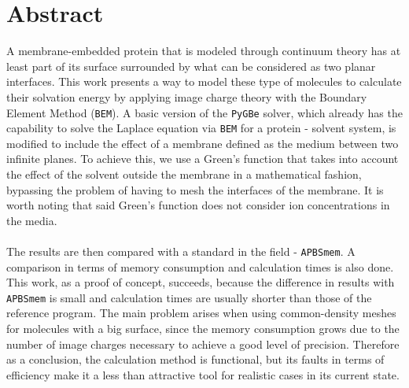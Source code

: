 \section*{Abstract}
\noindent
A membrane-embedded protein that is modeled through continuum theory has at least part of its surface surrounded by what can be considered as two planar interfaces. This work presents a way to model these type of molecules to calculate their solvation energy by applying image charge theory with the Boundary Element Method (\texttt{BEM}). A basic version of the \texttt{PyGBe} solver, which already has the capability to solve the Laplace equation via \texttt{BEM} for a protein - solvent system, is modified to include the effect of a membrane defined as the medium between two infinite planes. To achieve this, we use a Green's function that takes into account the effect of the solvent outside the membrane in a mathematical fashion, bypassing the problem of having to mesh the interfaces of the membrane. It is worth noting that said Green's function does not consider ion concentrations in the media.\\\\
The results are then compared with a standard in the field - \texttt{APBSmem}. A comparison in terms of memory consumption and calculation times is also done. This work, as a proof of concept, succeeds, because the difference in results with \texttt{APBSmem} is small and calculation times are usually shorter than those  of the reference program. The main problem arises when using common-density meshes for molecules with a big surface, since the memory consumption grows due to the number of image charges necessary to achieve a good level of precision. Therefore as a conclusion, the calculation method is functional, but its faults in terms of efficiency make it a less than attractive tool for realistic cases in its current state.